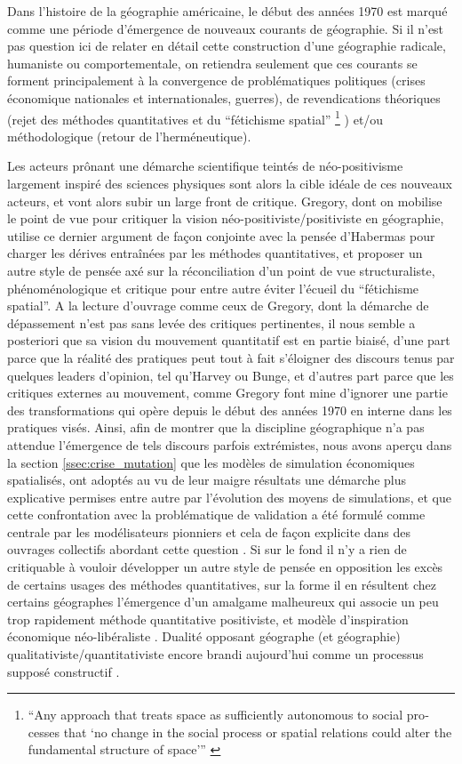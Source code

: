 Dans l'histoire de la géographie américaine, le début des années 1970 est marqué comme une période d'émergence de nouveaux courants de géographie. Si il n'est pas question ici de relater en détail cette construction d'une géographie radicale, humaniste ou comportementale, on retiendra seulement que ces courants se forment principalement à la convergence de problématiques politiques (crises économique nationales et internationales, guerres), de revendications théoriques (rejet des méthodes quantitatives et du \enquote{fétichisme spatial} \footnote{\foreignquote{english}{Any approach that treats space as sufficiently autonomous to social processes that ‘no change in the social process or spatial relations could alter the fundamental structure of space’} \autocite[712]{Gregory2009}} ) et/ou méthodologique (retour de l’herméneutique). 

Les acteurs prônant une démarche scientifique teintés de néo-positivisme largement inspiré des sciences physiques sont alors la cible idéale de ces nouveaux acteurs, et vont alors subir un large front de critique. Gregory, dont on mobilise le point de vue pour critiquer la vision néo-positiviste/positiviste en géographie, utilise ce dernier argument de façon conjointe avec la pensée d'Habermas pour charger les dérives entraînées par les méthodes quantitatives, et proposer un autre style de pensée axé sur la réconciliation d'un point de vue structuraliste, phénoménologique et critique pour entre autre éviter l'écueil du \enquote{fétichisme spatial}. A la lecture d'ouvrage comme ceux de Gregory, dont la démarche de dépassement n'est pas sans levée des critiques pertinentes, il nous semble a posteriori que sa vision du mouvement quantitatif est en partie biaisé, d'une part parce que la réalité des pratiques peut tout à fait s'éloigner des discours tenus par quelques leaders d'opinion, tel qu'Harvey ou Bunge, et d'autres part parce que les critiques externes au mouvement, comme Gregory font mine d'ignorer une partie des transformations qui opère depuis le début des années 1970 en interne dans les pratiques visés. Ainsi, afin de montrer que la discipline géographique n'a pas attendue l'émergence de tels discours parfois extrémistes, nous avons aperçu dans la section \ref{ssec:crise_mutation} que les modèles de simulation économiques spatialisés, ont adoptés au vu de leur maigre résultats une démarche plus explicative permises entre autre par l'évolution des moyens de simulations, et que cette confrontation avec la problématique de validation a été formulé comme centrale par les modélisateurs pionniers et cela de façon explicite dans des ouvrages collectifs abordant cette question \autocite{Marble1972}. Si sur le fond il n'y a rien de critiquable à vouloir développer un autre style de pensée en opposition les excès de certains usages des méthodes quantitatives, sur la forme il en résultent chez certains géographes l'émergence d'un amalgame malheureux qui associe un peu trop rapidement méthode quantitative positiviste, et modèle d'inspiration économique néo-libéraliste \autocite[61-64]{Paterson1984}. Dualité opposant géographe (et géographie) qualitativiste/quantitativiste encore brandi aujourd'hui comme un processus supposé constructif \autocite{Sheppard2001}. 

